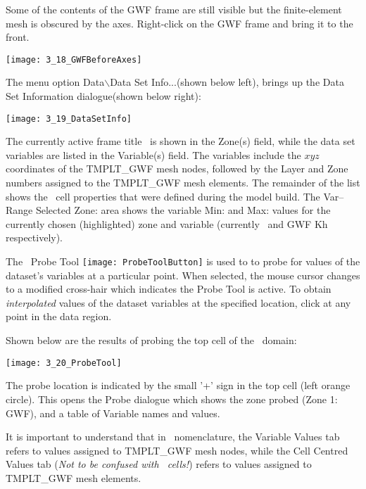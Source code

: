 Some of the contents of the {\sf GWF} frame are still visible but the finite-element mesh is obscured by the axes.  Right-click on the {\sf GWF} frame and bring it to the front.

        \texttt{[image: 3\_18\_GWFBeforeAxes]}

  The menu option {\sf Data$\backslash$Data Set Info...}(shown below left), brings up the {\sf Data Set Information} dialogue(shown below right): 

        \texttt{[image: 3\_19\_DataSetInfo]}

The currently active frame title \gwf\ is shown in the {\sf Zone(s)} field, while the data set variables are listed in the {\sf Variable(s)} field. The variables include the $xyz$ coordinates of the {\sf TMPLT\_GWF} mesh nodes, followed by the Layer and Zone numbers assigned to the {\sf TMPLT\_GWF} mesh elements.  The remainder of the list shows the \mfus\ cell properties that were defined during the model build. The {\sf Var--Range Selected Zone:} area shows the variable {\sf Min:} and {\sf Max:} values for the currently chosen (highlighted) zone and variable (currently \gwf\ and {\sf GWF Kh} respectively).   



 The \tecplot\ Probe Tool \texttt{[image: ProbeToolButton]} is used to to probe for values of the dataset's variables at a particular point. When selected, the mouse cursor changes to a modified cross-hair which indicates the Probe Tool is active. To obtain {\it interpolated} values of the dataset variables at the specified location, click at any point in the data region.

Shown below are the results of probing the top cell of the \gwf\ domain:

        \texttt{[image: 3\_20\_ProbeTool]}

The probe location is indicated by the small '+' sign in the top cell (left orange circle).  This opens the {\sf Probe} dialogue which shows the zone probed ({\sf Zone 1: GWF}), and a table of  Variable names and values.

It is important to understand that in \tecplot\ nomenclature, the {\sf Variable Values} tab refers to values assigned to {\sf TMPLT\_GWF} mesh nodes, while the {\sf Cell Centred Values} tab ({\em Not to be confused with \mf\ cells!}) refers to values assigned to {\sf TMPLT\_GWF} mesh elements.

